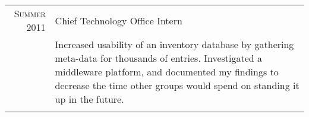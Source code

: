 \documentclass[letterpaper,10pt]{article}
\begin{document}
\begin{tabular}{R|p{6.2in}}
	\textsc{Summer} 2011           & Chief Technology Office Intern                                                                                                                                                                                                                                                                                                                                                                                                                                                                                                                                                                                                                                                                                                                                                                                                                                                                                                                                                                                                                                                                                                                                                                                                                    \\
	                               & \footnotesize Increased usability of an inventory database by gathering meta-data for thousands of entries. Investigated a middleware platform, and documented my findings to decrease the time other groups would spend on standing it up in the future.                                                                                                                                                                                                                                                                                                                                                                                                                                                                                                                                                                                                                                                                                                                                                                                                                                                                                                                                                                                         \\\\


\end{tabular}
\end{document}
